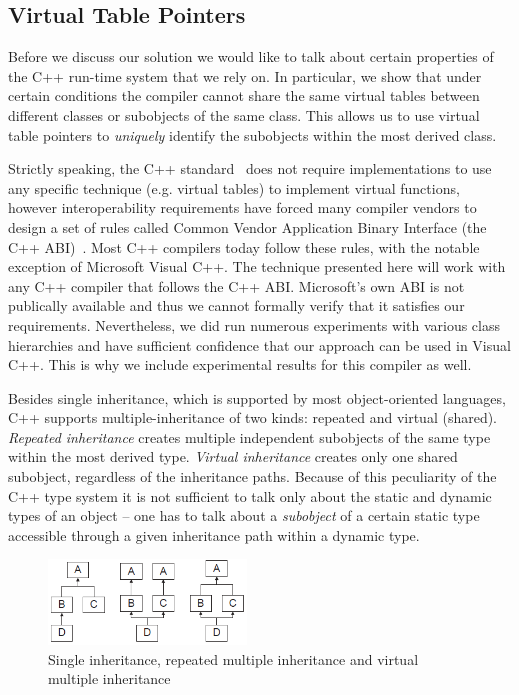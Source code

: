 \documentclass[preprint]{sigplanconf}
\begin{document}
\subsection{Virtual Table Pointers}
\label{sec:vtp}

Before we discuss our solution we would like to talk about certain properties of 
the C++ run-time system that we rely on. In particular,
we show that under certain conditions the compiler cannot share 
the same virtual tables between different classes or subobjects of the same 
class. This allows us to use virtual table pointers to \emph{uniquely} identify 
the subobjects within the most derived class.

Strictly speaking, the C++ standard~\cite{C++0x} does not require implementations 
to use any specific technique (e.g. virtual tables) to implement virtual functions, 
however interoperability requirements have forced many compiler vendors to design a 
set of rules called Common Vendor Application Binary Interface (the C++ 
ABI)~\cite{C++ABI}. Most C++ compilers today follow these rules, with the 
notable exception of Microsoft Visual C++. The technique presented here will 
work with any C++ compiler that follows the C++ ABI. Microsoft's own ABI is not 
publically available and thus we cannot formally verify that it satisfies 
our requirements. Nevertheless, we did run numerous experiments with various 
class hierarchies and have sufficient confidence that our approach can be used 
in Visual C++. This is why we include experimental results for this compiler as 
well.

Besides single inheritance, which is supported by most object-oriented languages, 
C++ supports multiple-inheritance of two kinds: repeated and virtual (shared). 
\emph{Repeated inheritance} creates multiple independent subobjects of the same 
type within the most derived type. \emph{Virtual inheritance} creates only one 
shared subobject, regardless of the inheritance paths. Because of this 
peculiarity of the C++ type system it is not sufficient to talk only about the 
static and dynamic types of an object -- one has to talk about a 
\emph{subobject} of a certain static type accessible through a given inheritance 
path within a dynamic type.

\begin{figure}[tbp]
  \centering
    \includegraphics[width=0.47\textwidth]{Hierarchies.png}
  \caption{Single inheritance, repeated multiple inheritance and virtual multiple inheritance}
  \label{fig:hierarchy}
\end{figure}
\end{document}
